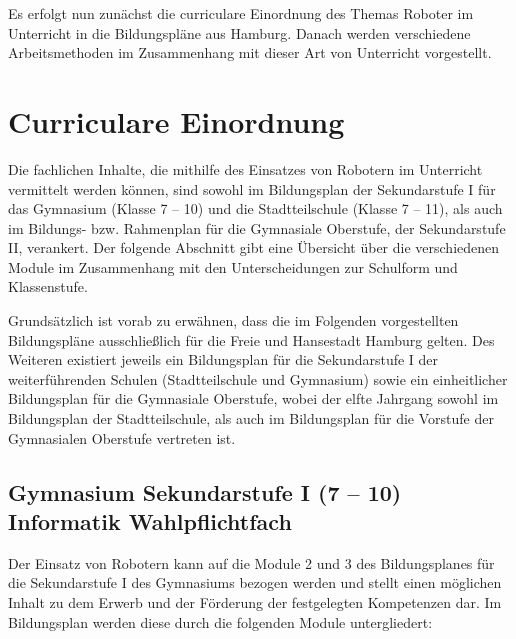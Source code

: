 \documentclass[paper=a4, DIV=calc, BCOR=12mm, twoside=on, onecolumn=on, open = right, titlepage =on, parskip =half-, headsepline = on, footsepline = off, chapterprefix = off, appendixprefix = on, fontsize = 12pt, numbers = noenddot, abstract = on]{scrbook}
\begin{document}
Es erfolgt nun zunächst die curriculare Einordnung des Themas Roboter im Unterricht in die Bildungspläne aus Hamburg. Danach werden verschiedene Arbeitsmethoden im Zusammenhang mit dieser Art von Unterricht vorgestellt.
\clearpage

\section{Curriculare Einordnung}
Die fachlichen Inhalte, die mithilfe des Einsatzes von Robotern im Unterricht vermittelt werden können, sind sowohl im Bildungsplan der Sekundarstufe I für das Gymnasium (Klasse 7 -- 10) und die Stadtteilschule (Klasse 7 -- 11), als auch im Bildungs- bzw. Rahmenplan für die Gymnasiale Oberstufe, der Sekundarstufe II, verankert. Der folgende Abschnitt gibt eine Übersicht über die verschiedenen Module im Zusammenhang mit den Unterscheidungen zur Schulform und Klassenstufe.

Grundsätzlich ist vorab zu erwähnen, dass die im Folgenden vorgestellten Bildungspläne ausschließlich für die Freie und Hansestadt Hamburg gelten. Des Weiteren existiert jeweils ein Bildungsplan für die Sekundarstufe I der weiterführenden Schulen (Stadtteilschule und Gymnasium) sowie ein einheitlicher Bildungsplan für die Gymnasiale Oberstufe, wobei der elfte Jahrgang sowohl im Bildungsplan der Stadtteilschule, als auch im Bildungsplan für die Vorstufe der Gymnasialen Oberstufe vertreten ist. 
\subsection{Gymnasium Sekundarstufe I (7 -- 10) Informatik Wahlpflichtfach}
Der Einsatz von Robotern kann auf die Module 2 und 3 des Bildungsplanes für die Sekundarstufe I des Gymnasiums bezogen werden und stellt einen möglichen Inhalt zu dem Erwerb und der Förderung der festgelegten Kompetenzen dar. Im Bildungsplan werden diese durch die folgenden Module untergliedert:
\clearpage
\end{document}
